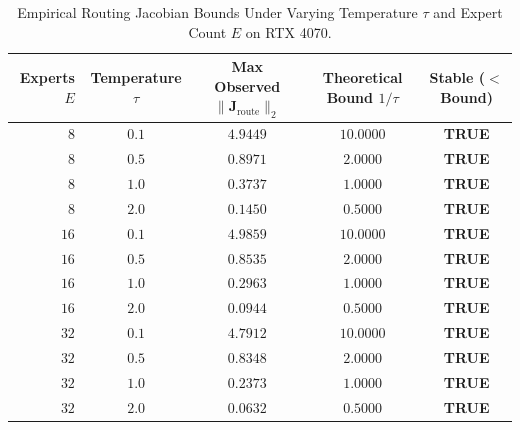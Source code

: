 \documentclass[journal]{IEEEtran}
\begin{document}
\begin{table}[h]
\centering
\caption{Empirical Routing Jacobian Bounds Under Varying Temperature $\tau$ and Expert Count $E$ on RTX 4070.}
\label{tab:routing_stability}
\begin{tabular}{rcccc}
\toprule
\textbf{Experts} $E$ & \textbf{Temperature} $\tau$ & \textbf{Max Observed} $\|\mathbf{J}_{\text{route}}\|_2$ & \textbf{Theoretical Bound} $1/\tau$ & \textbf{Stable ($<$ Bound)} \\
\midrule
$8$  & $0.1$ & $4.9449$ & $10.0000$ & \textbf{TRUE} \\
$8$  & $0.5$ & $0.8971$ & $2.0000$  & \textbf{TRUE} \\
$8$  & $1.0$ & $0.3737$ & $1.0000$  & \textbf{TRUE} \\
$8$  & $2.0$ & $0.1450$ & $0.5000$  & \textbf{TRUE} \\
$16$ & $0.1$ & $4.9859$ & $10.0000$ & \textbf{TRUE} \\
$16$ & $0.5$ & $0.8535$ & $2.0000$  & \textbf{TRUE} \\
$16$ & $1.0$ & $0.2963$ & $1.0000$  & \textbf{TRUE} \\
$16$ & $2.0$ & $0.0944$ & $0.5000$  & \textbf{TRUE} \\
$32$ & $0.1$ & $4.7912$ & $10.0000$ & \textbf{TRUE} \\
$32$ & $0.5$ & $0.8348$ & $2.0000$  & \textbf{TRUE} \\
$32$ & $1.0$ & $0.2373$ & $1.0000$  & \textbf{TRUE} \\
$32$ & $2.0$ & $0.0632$ & $0.5000$  & \textbf{TRUE} \\
\bottomrule
\end{tabular}
\end{table}
\end{document}
